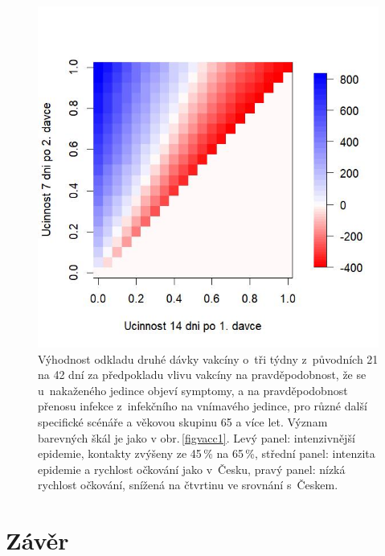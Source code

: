 \begin{figure}[ht!]
\begin{center}
\begin{minipage}[m]{0.3\linewidth}
		\end{minipage}
		\begin{minipage}[m]{0.3\linewidth}
			\includegraphics[width=\textwidth]{pic/SA4lessL_DIFF_mean_T.jpg}
		\end{minipage}
	\end{center}
	\caption{Výhodnost odkladu druhé dávky vakcíny o~tři týdny z~původních 21 na 42 dní za předpokladu vlivu vakcíny na pravděpodobnost, že se u~nakaženého jedince objeví symptomy, a na pravděpodobnost přenosu infekce z~infekčního na vnímavého jedince, pro různé další specifické scénáře a věkovou skupinu 65 a více let. Význam barevných škál je jako v obr.\,\ref{figvacc1}. Levý panel: intenzivnější epidemie, kontakty zvýšeny ze 45\,\% na 65\,\%, střední panel: intenzita epidemie a rychlost očkování jako v~Česku, pravý panel: nízká rychlost očkování, snížená na čtvrtinu ve srovnání s~Českem.}
	\label{figvacc3}
\end{figure}

\section*{Závěr}

